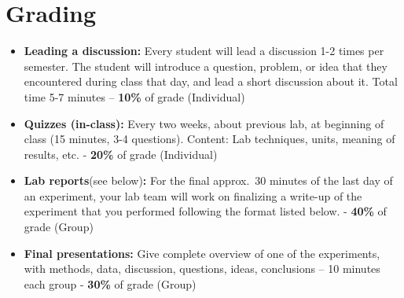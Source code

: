 \section*{Grading}
\begin{itemize}
\item \textbf{Leading a discussion:} Every student will lead a discussion 1-2 times per semester. The student will introduce a question, problem, or idea that they encountered during class that day, and lead a short discussion about it. Total time 5-7 minutes – \textbf{10\%} of grade (Individual)
\item \textbf{Quizzes (in-class):} Every two weeks, about previous lab, at beginning of class (15 minutes, 3-4 questions). Content: Lab techniques, units, meaning of results, etc. - \textbf{20\%} of grade (Individual)
\item \textbf{Lab reports}(see below)\textbf{:} For the final approx.\ 30 minutes of the last day of an experiment, your lab team will work on finalizing a write-up of the experiment that you performed following the format listed below. - \textbf{40\%} of grade (Group)
\item \textbf{Final presentations:} Give complete overview of one of the experiments, with methods, data, discussion, questions, ideas, conclusions – 10 minutes each group - \textbf{30\%} of grade (Group)
\end{itemize}

